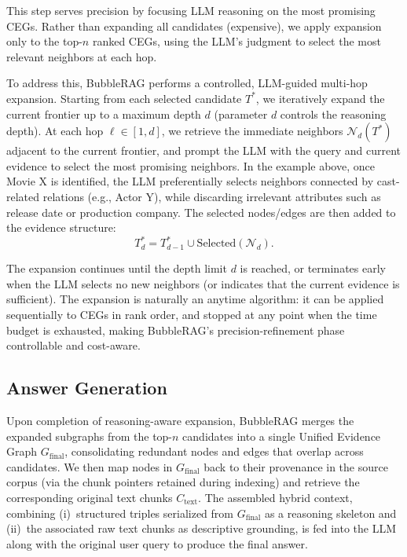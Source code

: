 This step serves precision by focusing LLM reasoning on the most promising CEGs. Rather than expanding all candidates (expensive), we apply expansion only to the top-$n$ ranked CEGs, using the LLM's judgment to select the most relevant neighbors at each hop.

To address this, BubbleRAG performs a controlled, LLM-guided multi-hop
expansion. Starting from each selected candidate $T^*$, we iteratively expand
the current frontier up to a maximum depth $d$ (parameter $d$ controls the reasoning depth). At each hop $\ell\in[1,d]$, we
retrieve the immediate neighbors $\mathcal{N}_d(T^*)$ adjacent to the current
frontier, and prompt the LLM with the query and current evidence to select the most
promising neighbors. In the example above, once Movie X is identified,
the LLM preferentially selects neighbors connected by cast-related relations
(e.g., Actor Y), while discarding irrelevant attributes such as release
date or production company. The selected nodes/edges are then added to the
evidence structure:
\[
T^*_{d} = T^*_{d-1} \cup \text{Selected}\!\left(\mathcal{N}_d\right).
\]

The expansion continues until the depth limit $d$ is reached, or terminates
early when the LLM selects no new neighbors (or indicates that the current
evidence is sufficient). The expansion is naturally an anytime algorithm: it can be applied sequentially to CEGs in rank order, and stopped at any point when the time budget is exhausted, making BubbleRAG's precision-refinement phase controllable and cost-aware.


\subsection{Answer Generation}\label{sec:answer-gen}


Upon completion of reasoning-aware expansion, BubbleRAG merges the expanded subgraphs from the top-$n$ candidates into a single Unified Evidence Graph $G_{\text{final}}$, consolidating redundant nodes and edges that overlap across candidates. We then map nodes in $G_{\text{final}}$ back to their provenance in the source corpus (via the chunk pointers retained during indexing) and retrieve the corresponding original text chunks $C_{\text{text}}$. The assembled hybrid context, combining (i)~structured triples serialized from $G_{\text{final}}$ as a reasoning skeleton and (ii)~the associated raw text chunks as descriptive grounding, is fed into the LLM along with the original user query to produce the final answer.



